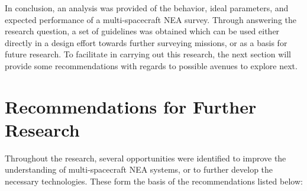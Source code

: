 In conclusion, an analysis was provided of the behavior, ideal parameters, and expected performance of a multi-spacecraft NEA survey. Through answering the research question, a set of guidelines was obtained which can be used either directly in a design effort towards further surveying missions, or as a basis for future research. To facilitate in carrying out this research, the next section will provide some recommendations with regards to possible avenues to explore next.

\section{Recommendations for Further Research}
Throughout the research, several opportunities were identified to improve the understanding of multi-spacecraft NEA systems, or to further develop the necessary technologies. These form the basis of the recommendations listed below:
